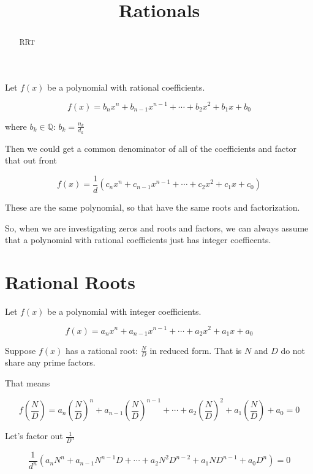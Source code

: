 \documentclass{ximera}
\title{Rationals}
\begin{document}
\begin{abstract}
RRT
\end{abstract}
\maketitle




Let $f(x)$ be a polynomial with rational coefficients.

\[   f(x) = b_n x^n + b_{n-1} x^{n-1} + \cdots + b_2 x^2 + b_1 x + b_0     \]


where $b_k \in \mathbb{Q}$:  $b_k = \frac{n_k}{d_k}$


Then we could get a common denominator of all of the coefficients and factor that out front



\[   f(x) = \frac{1}{d}(c_n x^n + c_{n-1} x^{n-1} + \cdots + c_2 x^2 + c_1 x + c_0)    \]


These are the same polynomial, so that have the same roots and factorization.


So, when we are investigating zeros and roots and factors, we can always assume that a polynomial with rational coefficients just has integer coefficents.




\section{Rational Roots}

Let $f(x)$ be a polynomial with integer coefficients.

\[   f(x) = a_n x^n + a_{n-1} x^{n-1} + \cdots + a_2 x^2 + a_1 x + a_0     \]


Suppose $f(x)$ has a rational root:  $\frac{N}{D}$ in reduced form.  That is $N$ and $D$ do not share any prime factors.



That means


\[    f \left( \frac{N}{D} \right) = a_n \left( \frac{N}{D} \right)^n + a_{n-1} \left( \frac{N}{D} \right)^{n-1} + \cdots + a_2 \left( \frac{N}{D} \right)^2 + a_1 \left( \frac{N}{D} \right) + a_0  = 0       \]


Let's factor out $\frac{1}{D^n}$





\[   \frac{1}{d^n} (a_n N^n + a_{n-1} N^{n-1} D + \cdots + a_2 N^2 D^{n-2}+ a_1 N D^{n-1} + a_0 D^n)  = 0       \]
\end{document}
